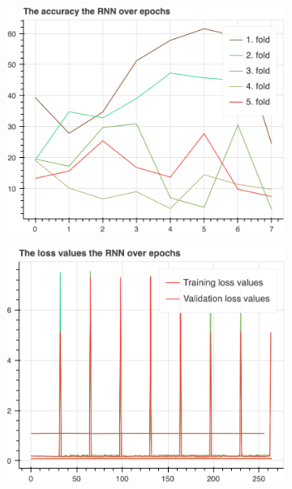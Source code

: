 		\begin{figure}[H]
			\centering
			\begin{subfigure}[b]{0.49\textwidth}
				\centering
				\includegraphics[width=\textwidth]{img/RNN-accuracy.png}
			\end{subfigure}
			\begin{subfigure}[b]{0.49\textwidth}
				\centering
				\includegraphics[width=\textwidth]{img/RNN-loss_values.png}
			\end{subfigure}
			\hfill
			\begin{subfigure}[b]{0.49\textwidth}

\end{subfigure}
\end{figure}
